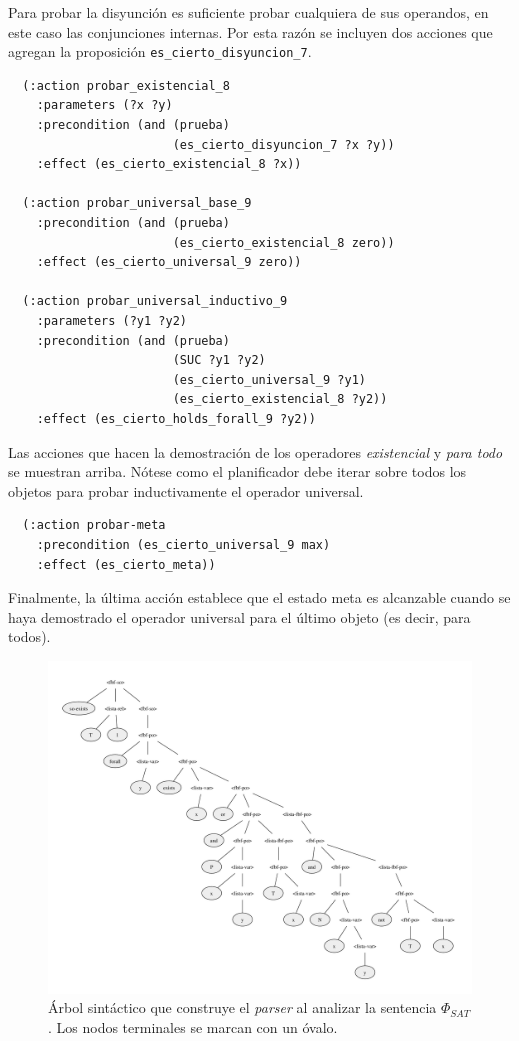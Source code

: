 Para probar la disyunción es suficiente probar cualquiera de sus operandos, en
este caso las conjunciones internas. Por esta razón se incluyen dos acciones
que agregan la proposición \texttt{es\_cierto\_disyuncion\_7}.

\begin{verbatim}
  (:action probar_existencial_8
    :parameters (?x ?y)
    :precondition (and (prueba)
                       (es_cierto_disyuncion_7 ?x ?y))
    :effect (es_cierto_existencial_8 ?x))

  (:action probar_universal_base_9
    :precondition (and (prueba)
                       (es_cierto_existencial_8 zero))
    :effect (es_cierto_universal_9 zero))

  (:action probar_universal_inductivo_9
    :parameters (?y1 ?y2)
    :precondition (and (prueba)
                       (SUC ?y1 ?y2)
                       (es_cierto_universal_9 ?y1)
                       (es_cierto_existencial_8 ?y2))
    :effect (es_cierto_holds_forall_9 ?y2))
\end{verbatim}

Las acciones que hacen la demostración de los operadores \textit{existencial} y 
\textit{para todo} se muestran arriba. Nótese como el planificador debe iterar
sobre todos los objetos para probar inductivamente el operador universal.

\begin{verbatim}
  (:action probar-meta
    :precondition (es_cierto_universal_9 max)
    :effect (es_cierto_meta))
\end{verbatim}

Finalmente, la última acción establece que el estado meta es alcanzable cuando
se haya demostrado el operador universal para el último objeto (es decir, para
todos).

\begin{landscape}
\begin{figure}[h!]
\centering
\includegraphics[height=\textheight]{figuras/arbolsintaxis.pdf}
\caption[Arbol sintáctico de $\Phi_{SAT}$]{Árbol sintáctico que construye el \textit{parser} al analizar la
sentencia $\Phi_{SAT}$. Los nodos terminales se marcan con un óvalo.}
\label{arbolsintactico}
\end{figure}
\end{landscape}

